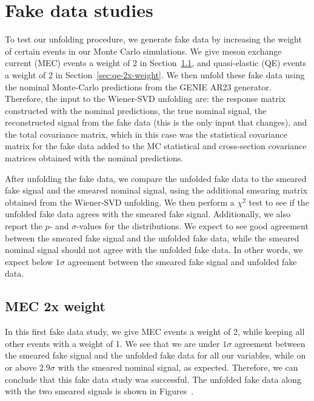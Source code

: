 \documentclass{article}
\begin{document}
\clearpage

\section{Fake data studies}

To test our unfolding procedure, we generate fake data by increasing the weight of certain events in 
our Monte Carlo simulations. We give meson exchange current (MEC) events a weight of 2 in Section~\ref{sec:mec-2x-weight},
and quasi-elastic (QE) events a weight of 2 in Section~\ref{sec:qe-2x-weight}. We then unfold these fake data
using the nominal Monte-Carlo predictions from the GENIE AR23 generator. Therefore, the input to the Wiener-SVD 
unfolding are: the response matrix constructed with the nominal predictions, the true nominal signal, 
the reconstructed signal from the fake data (this is the only input that changes), and the total covariance matrix, 
which in this case was the statistical covariance matrix for the fake data added to the MC statistical and cross-section
covariance matrices obtained with the nominal predictions. 

After unfolding the fake data, we compare the unfolded fake data to the smeared fake signal and the smeared 
nominal signal, using the additional smearing matrix obtained from the Wiener-SVD unfolding. We then perform 
a $\chi^2$ test to see if the unfolded fake data agrees with the smeared fake signal. Additionally, we also 
report the $p$- and $\sigma$-values for the distributions. We expect to see good agreement between the smeared 
fake signal and the unfolded fake data, while the smeared nominal signal should not agree with the unfolded fake data.
In other words, we expect below $1\sigma$ agreement between the smeared fake signal and unfolded fake data. 

\subsection{MEC 2x weight}\label{sec:mec-2x-weight}

In this first fake data study, we give MEC events a weight of 2, while keeping all other events with a weight of 1.
We see that we are under $1\sigma$ agreement between the smeared fake signal and the unfolded fake data for all 
our variables, while on or above $2.9\sigma$ with the smeared nominal signal, as expected. Therefore, we can 
conclude that this fake data study was successful. The unfolded fake data along with the two smeared signals 
is shown in Figures~.
\end{document}
